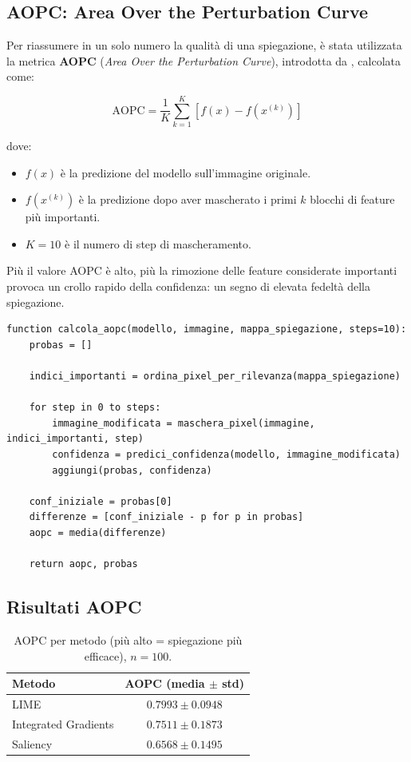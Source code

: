 \documentclass{article}
\begin{document}
\subsection{AOPC: Area Over the Perturbation Curve}
Per riassumere in un solo numero la qualità di una spiegazione, è stata
utilizzata la metrica \textbf{AOPC} (\emph{Area Over the Perturbation Curve}),
introdotta da \citet{samek2016evaluating}, calcolata come:

\[
      \mathrm{AOPC} = \frac{1}{K} \sum_{k=1}^K \left[ f(x) - f(x^{(k)}) \right]
\]

dove:
\begin{itemize}
      \item $f(x)$ è la predizione del modello sull’immagine originale.
      \item $f(x^{(k)})$ è la predizione dopo aver mascherato i primi $k$ blocchi di feature più importanti.
      \item $K=10$ è il numero di step di mascheramento.
\end{itemize}

Più il valore AOPC è alto, più la rimozione delle feature considerate
importanti provoca un crollo rapido della confidenza: un segno di elevata
fedeltà della spiegazione.

\begin{lstlisting}[caption={Procedura MoRF e calcolo AOPC}, label={lst:morf_aopc}]
function calcola_aopc(modello, immagine, mappa_spiegazione, steps=10):
    probas = []
    
    indici_importanti = ordina_pixel_per_rilevanza(mappa_spiegazione)
    
    for step in 0 to steps:
        immagine_modificata = maschera_pixel(immagine, indici_importanti, step)
        confidenza = predici_confidenza(modello, immagine_modificata)
        aggiungi(probas, confidenza)
    
    conf_iniziale = probas[0]
    differenze = [conf_iniziale - p for p in probas]
    aopc = media(differenze)
    
    return aopc, probas
\end{lstlisting}

\subsection{Risultati AOPC}
\begin{table}[h!]
      \centering
      \renewcommand{\arraystretch}{1.1}
      \begin{tabular}{lc}
            \hline
            \textbf{Metodo}      & \textbf{AOPC (media $\pm$ std)} \\
            \hline
            LIME                 & $0.7993 \pm 0.0948$             \\
            Integrated Gradients & $0.7511 \pm 0.1873$             \\
            Saliency             & $0.6568 \pm 0.1495$             \\
            \hline
      \end{tabular}
      \caption{AOPC per metodo (più alto = spiegazione più efficace), $n=100$.}
      \label{tab:aopc_results}
\end{table}
\end{document}
